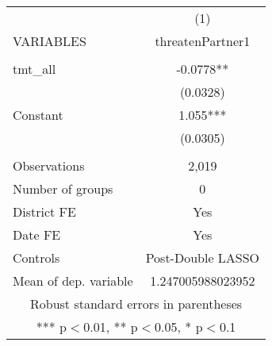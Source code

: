 \documentclass[]{article}
\begin{document}
\begin{tabular}{lc} \hline
 & (1) \\
VARIABLES & threatenPartner1 \\ \hline
 &  \\
tmt\_all & -0.0778** \\
 & (0.0328) \\
Constant & 1.055*** \\
 & (0.0305) \\
 &  \\
Observations & 2,019 \\
Number of groups & 0 \\
District FE & Yes \\
Date FE & Yes \\
Controls & Post-Double LASSO \\
 Mean of dep. variable & 1.247005988023952 \\ \hline
\multicolumn{2}{c}{ Robust standard errors in parentheses} \\
\multicolumn{2}{c}{ *** p$<$0.01, ** p$<$0.05, * p$<$0.1} \\
\end{tabular}
\end{document}
